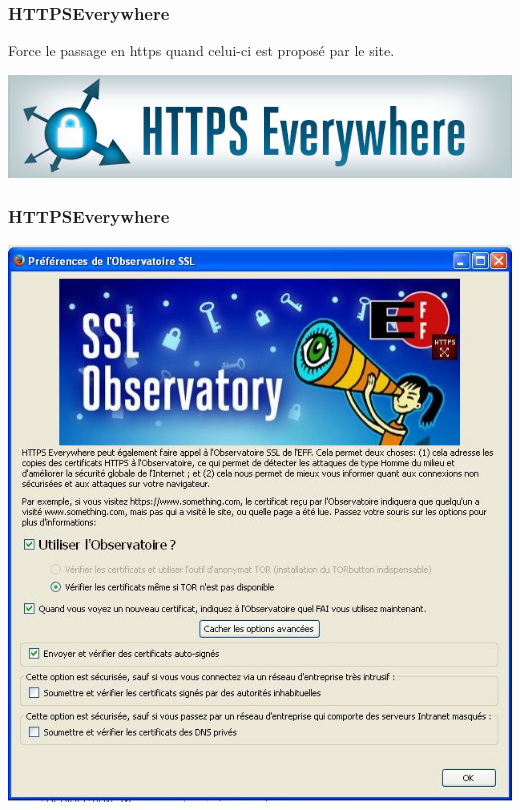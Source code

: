 \documentclass{beamer}
\begin{document}
\begin{frame}
\frametitle{HTTPSEverywhere}

Force le passage en https quand celui-ci est proposé par le site.

\begin{center}
\includegraphics[scale=0.4] {./images/https-everywhere.jpg}
\end{center}
\end{frame}

\begin{frame}
\frametitle{HTTPSEverywhere}

\begin{center}
\includegraphics[scale=0.4] {./images/Https_SSL_Observatory.jpg}
\end{center}
\end{frame}
\end{document}
